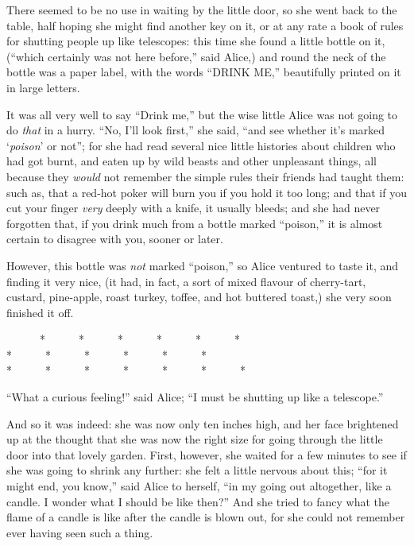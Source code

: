\documentclass[book, 20pt]{extbook}
\begin{document}
There seemed to be no use in waiting by the little door, so she went
back to the table, half hoping she might find another key on it, or at
any rate a book of rules for shutting people up like telescopes: this
time she found a little bottle on it, (``which certainly was not here
before,'' said Alice,) and round the neck of the bottle was a paper
label, with the words ``DRINK ME,'' beautifully printed on it in large
letters.

It was all very well to say ``Drink me,'' but the wise little Alice was
not going to do \emph{that} in a hurry. ``No, I'll look first,'' she
said, ``and see whether it's marked `\emph{poison}' or not''; for she
had read several nice little histories about children who had got burnt,
and eaten up by wild beasts and other unpleasant things, all because
they \emph{would} not remember the simple rules their friends had taught
them: such as, that a red-hot poker will burn you if you hold it too
long; and that if you cut your finger \emph{very} deeply with a knife,
it usually bleeds; and she had never forgotten that, if you drink much
from a bottle marked ``poison,'' it is almost certain to disagree with
you, sooner or later.

However, this bottle was \emph{not} marked ``poison,'' so Alice ventured
to taste it, and finding it very nice, (it had, in fact, a sort of mixed
flavour of cherry-tart, custard, pine-apple, roast turkey, toffee, and
hot buttered toast,) she very soon finished it off.

\begin{center}
{\footnotesize ~~~~~~*~~~~~~*~~~~~~*~~~~~~*~~~~~~*~~~~~~*\\
*~~~~~~*~~~~~~*~~~~~~*~~~~~~*~~~~~~*\\
*~~~~~~*~~~~~~*~~~~~~*~~~~~~*~~~~~~*~~~~~~*\\}
\end{center}

\newpage

``What a curious feeling!'' said Alice; ``I must be shutting up like a
telescope.''

And so it was indeed: she was now only ten inches high, and her face
brightened up at the thought that she was now the right size for going
through the little door into that lovely garden. First, however, she
waited for a few minutes to see if she was going to shrink any further:
she felt a little nervous about this; ``for it might end, you know,''
said Alice to herself, ``in my going out altogether, like a candle. I
wonder what I should be like then?'' And she tried to fancy what the
flame of a candle is like after the candle is blown out, for she could
not remember ever having seen such a thing.
\end{document}

